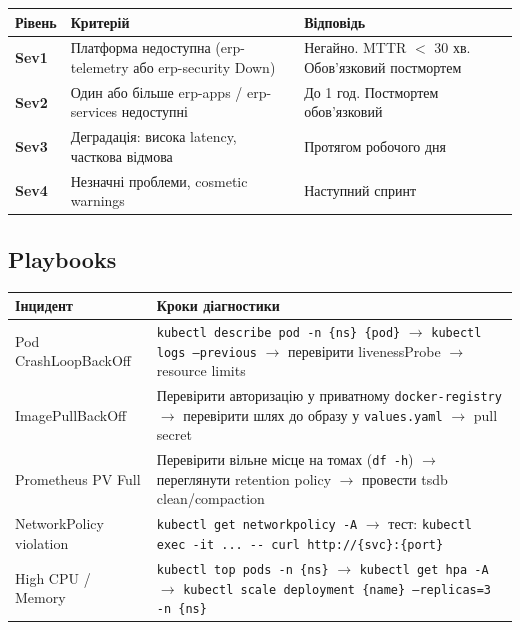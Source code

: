 \documentclass[12pt,a4paper]{article}
\begin{document}
\begin{longtable}{C{2cm} L{4cm} L{8cm}}
\toprule
{}
\color{primary}\textbf{Рівень} &
\color{primary}\textbf{Критерій} &
\color{primary}\textbf{Відповідь} \\
\midrule\endhead\bottomrule\endfoot
\textcolor{warnred}{\textbf{Sev1}}
  & Платформа недоступна (erp-telemetry або erp-security Down)
  & Негайно. MTTR $<$ 30 хв. Обов'язковий постмортем \\[4pt]
\textcolor{warnred}{\textbf{Sev2}}
  & Один або більше erp-apps / erp-services недоступні
  & До 1 год. Постмортем обов'язковий \\[4pt]
\textcolor{tieryellow}{\textbf{Sev3}}
  & Деградація: висока latency, часткова відмова
  & Протягом робочого дня \\[4pt]
\textcolor{successgreen}{\textbf{Sev4}}
  & Незначні проблеми, cosmetic warnings
  & Наступний спринт \\[4pt]
\end{longtable}

\subsection{Playbooks}

\begin{longtable}{L{4.5cm} L{9.5cm}}
\toprule
{}
\color{primary}\textbf{Інцидент} & \color{primary}\textbf{Кроки діагностики} \\
\midrule\endhead\bottomrule\endfoot
Pod CrashLoopBackOff
  & \texttt{kubectl describe pod -n \{ns\} \{pod\}} $\to$
    \texttt{kubectl logs --previous} $\to$
    перевірити livenessProbe $\to$ resource limits \\[4pt]
ImagePullBackOff
  & Перевірити авторизацію у приватному \texttt{docker-registry} $\to$
    перевірити шлях до образу у \texttt{values.yaml} $\to$ pull secret \\[4pt]
Prometheus PV Full
  & Перевірити вільне місце на томах (\texttt{df -h}) $\to$
    переглянути retention policy $\to$ провести tsdb clean/compaction \\[4pt]
NetworkPolicy violation
  & \texttt{kubectl get networkpolicy -A} $\to$
    тест: \texttt{kubectl exec -it ... -{}- curl http://\{svc\}:\{port\}} \\[4pt]
High CPU / Memory
  & \texttt{kubectl top pods -n \{ns\}} $\to$
    \texttt{kubectl get hpa -A} $\to$
    \texttt{kubectl scale deployment \{name\} --replicas=3 -n \{ns\}} \\[4pt]
\end{longtable}
\end{document}
